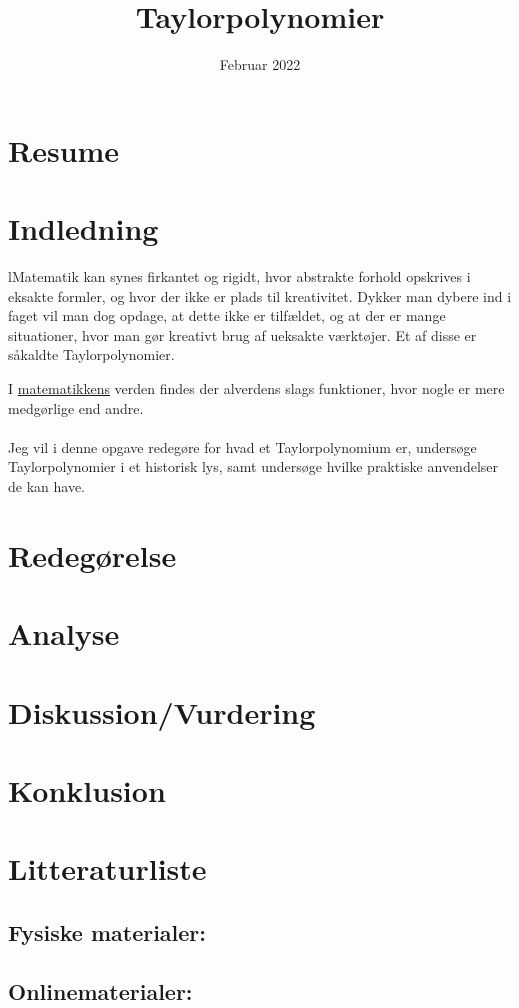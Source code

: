 \documentclass[12pt, a4paper]{article}
\title{Taylorpolynomier}
\date{Februar 2022}
\begin{document}
\maketitle
\section*{Resume} %
\blindtext[1-2]
\tableofcontents
\newpage



\section{Indledning} %
lMatematik kan synes firkantet og rigidt, hvor abstrakte forhold opskrives i eksakte formler, og hvor der ikke er plads til kreativitet. Dykker man dybere ind i faget vil man dog opdage, at dette ikke er tilfældet, og at der er mange situationer, hvor man gør kreativt brug af ueksakte værktøjer. Et af disse er såkaldte Taylorpolynomier.


I \underline{matematikkens} verden findes der alverdens slags funktioner, hvor nogle er mere medgørlige end andre.\\
\\
Jeg vil i denne opgave redegøre for hvad et Taylorpolynomium er, undersøge Taylorpolynomier i et historisk lys, samt undersøge hvilke praktiske anvendelser de kan have.

\section{Redegørelse} %

\section{Analyse} %

\section{Diskussion/Vurdering} %


\section{Konklusion} %

\section{Litteraturliste}
\nocite{*}
\subsection{Fysiske materialer:}
\printbibliography[keyword=bøger]
\subsection{Onlinematerialer:}
\printbibliography[keyword=online]
\end{document}

